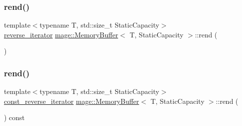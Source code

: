 \mbox{\label{classmage_1_1_memory_buffer_afac3f602ce95c1eee3f8d3f3b774d211}} 
\subsubsection{\texorpdfstring{rend()}{rend()}\hspace{0.1cm}{\footnotesize\ttfamily [1/2]}}
{\footnotesize\ttfamily template$<$typename T, std\+::size\+\_\+t Static\+Capacity$>$ \\
\mbox{\hyperlink{classmage_1_1_memory_buffer_a0ff72cf71e4955a859ed8afd70832c92}{reverse\+\_\+iterator}} \mbox{\hyperlink{classmage_1_1_memory_buffer}{mage\+::\+Memory\+Buffer}}$<$ T, Static\+Capacity $>$\+::rend (\begin{DoxyParamCaption}{ }\end{DoxyParamCaption})\hspace{0.3cm}{\ttfamily [noexcept]}}

\mbox{\label{classmage_1_1_memory_buffer_a8c3f78efc7d362cb4e5c5ba4ec6b772b}} 
\subsubsection{\texorpdfstring{rend()}{rend()}\hspace{0.1cm}{\footnotesize\ttfamily [2/2]}}
{\footnotesize\ttfamily template$<$typename T, std\+::size\+\_\+t Static\+Capacity$>$ \\
\mbox{\hyperlink{classmage_1_1_memory_buffer_a95188e283a195d9aa2730deb6b1c1a79}{const\+\_\+reverse\+\_\+iterator}} \mbox{\hyperlink{classmage_1_1_memory_buffer}{mage\+::\+Memory\+Buffer}}$<$ T, Static\+Capacity $>$\+::rend (\begin{DoxyParamCaption}{ }\end{DoxyParamCaption}) const\hspace{0.3cm}{\ttfamily [noexcept]}}

\mbox{\label{classmage_1_1_memory_buffer_ac1aa17aac0bb038ed0f2a2271b6bb747}} 
